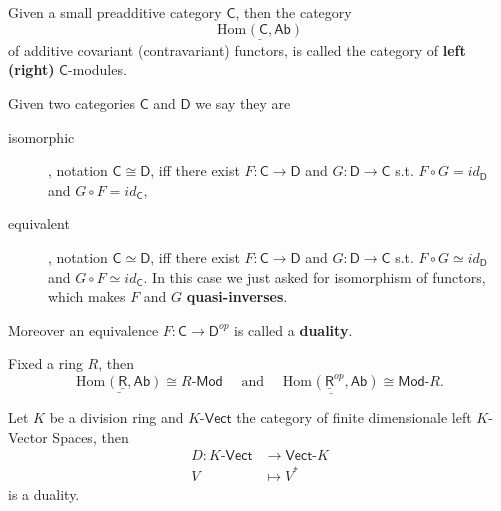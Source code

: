\begin{defn}
	Given a small preadditive category $\mathsf{C}$, then the category
	\begin{equation}
		\underline{\mathrm{Hom}_{\mathsf{}} \left( \mathsf{C}, \mathsf{Ab} \right)}
	\end{equation} 
	of additive covariant (contravariant) functors, is called the category of \textbf{left (right) } $\mathsf{C}$-modules.
\end{defn}

\begin{defn}
	Given two categories $\mathsf{C}$ and $\mathsf{D}$ we say they are
	\begin{description}
		\item[isomorphic], notation $\mathsf{C} \cong \mathsf{D}$, iff there exist $F: \mathsf{C} \to \mathsf{D}$ and $G: \mathsf{D} \to \mathsf{C}$ s.t. $F \circ G = id_{\mathsf{D}}$ and $G \circ F = id_\mathsf{C}$,
		\item[equivalent], notation $\mathsf{C} \simeq \mathsf{D}$, iff there exist $F: \mathsf{C} \to \mathsf{D}$ and $G: \mathsf{D} \to \mathsf{C}$ s.t. $F \circ G \simeq id_{\mathsf{D}}$ and $G \circ F \simeq id_\mathsf{C}$.
			In this case we just asked for isomorphism of functors, which makes $F$ and $G$ \textbf{quasi-inverses}.
	\end{description} 

	Moreover an equivalence $F: \mathsf{C} \to \mathsf{D}^{op}$ is called a  \textbf{duality}.
\end{defn}

\begin{rem}
	Fixed a ring $R$, then 
	\begin{equation}
		\underline{\mathrm{Hom}_{\mathsf{}} \left( \underline{\mathsf{R}}, \mathsf{Ab} \right)} \cong R \text{-}\mathsf{Mod} 
		\quad \text{ and } \quad
		\underline{\mathrm{Hom}_{\mathsf{}} \left( \underline{\mathsf{R}}^{op}, \mathsf{Ab} \right)} \cong \mathsf{Mod}\text{-}R
	.\end{equation} 
\end{rem}

\begin{ex}[duality]
	Let $K$ be a division ring and $K$-$\mathsf{Vect}$ the category of finite dimensionale left $K$-Vector Spaces, then
	\begin{align}
		D: K \text{-}\mathsf{Vect} &\to \mathsf{Vect} \text{-}K \\
		V &\mapsto V^*
	\end{align} 
	is a duality.
\end{ex} 

